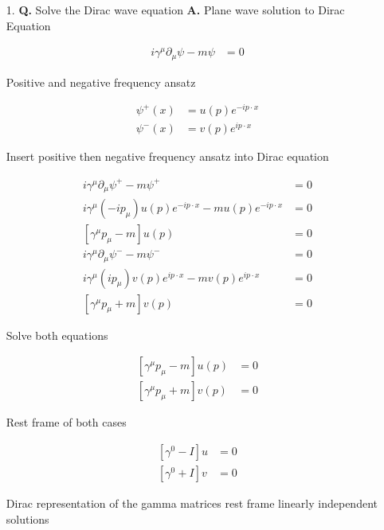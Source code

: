\documentclass[main.tex]{subfiles}
\begin{document}
\begin{enumerate}
    \item [1.] \textbf{Q.} Solve the Dirac wave equation \textbf{A.} Plane wave solution to Dirac Equation
    
    $$
    \begin{aligned}        
    i \gamma^\mu \partial_\mu \psi -m \psi &= 0 
    \end{aligned}
    $$

    Positive and negative frequency ansatz

    $$
    \begin{aligned}        
    \psi^{+}(x) &= u(p) e^{-i p \cdot x}\\
    \psi^{-}(x) &= v(p) e^{i p \cdot x}
    \end{aligned}
    $$

    Insert positive then negative frequency ansatz into Dirac equation

    $$
    \begin{aligned}
    i \gamma^\mu \partial_\mu \psi^{+}-m \psi^{+} & =0 \\
    i \gamma^\mu\left(-i p_\mu\right) u(p) e^{-i p \cdot x}-m u(p) e^{-i p \cdot x} & =0 \\
    \left[\gamma^\mu p_\mu-m\right] u(p) &= 0\\
    i \gamma^\mu \partial_\mu \psi^{-}-m \psi^{-} &= 0 \\
    i \gamma^\mu\left(i p_\mu\right) v(p) e^{i p \cdot x}-m v(p) e^{i p \cdot x} &=0 \\
    \left[\gamma^\mu p_\mu+m\right] v(p) &=0 
    \end{aligned}
    $$

    Solve both equations

    $$
    \begin{aligned}
    \left[\gamma^\mu p_\mu-m\right] u(p) &= 0 \\
    \left[\gamma^\mu p_\mu+m\right] v(p) &=0
    \end{aligned}
    $$

    Rest frame of both cases

    $$
    \begin{aligned}
    \left[\gamma^0-I\right] u &= 0 \\
    \left[\gamma^0+I\right] v &= 0
    \end{aligned}
    $$
    
    Dirac representation of the gamma matrices rest frame linearly independent solutions 


\end{enumerate}
\end{document}
